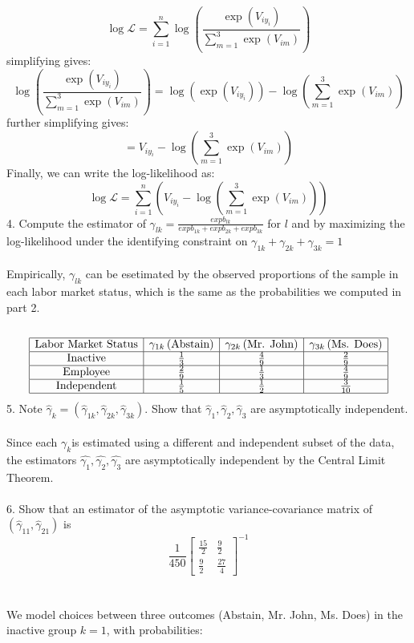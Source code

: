 \documentclass[12pt]{article}
\begin{document}
\begin{flushleft}
\[
\log \mathcal{L} = \sum_{i=1}^n \log\left( \frac{\exp(V_{iy_i})}{\sum_{m=1}^3 \exp(V_{im})} \right)
\]
simplifying gives:
\[
\log\left( \frac{\exp(V_{iy_i})}{\sum_{m=1}^3 \exp(V_{im})} \right) = \log(\exp(V_{iy_i})) - \log\left( \sum_{m=1}^3 \exp(V_{im}) \right)
\]
further simplifying gives:
\[
= V_{iy_i} - \log\left( \sum_{m=1}^3 \exp(V_{im}) \right)
\]
Finally, we can write the log-likelihood as:
\[
\log \mathcal{L} = \sum_{i=1}^{n} \left( V_{iy_i} - \log\left( \sum_{m=1}^3 \exp(V_{im}) \right) \right)
\]
4. Compute the estimator of $\gamma_{lk}=\frac{exp b_{lk}}{exp b_{1k}+exp b_{2k}+exp b_{3k}}$ for $l$ and by maximizing the log-likelihood under the identifying constraint on $\gamma_{1k}+\gamma_{2k}+\gamma_{3k}=1$\\~\\
Empirically, $\gamma_{lk}$ can be esetimated by the observed proportions of the sample in each labor market status, which is the same as the probabilities we computed in part 2.\\~\\
\[
\begin{array}{|c|c|c|c|}
\hline
\text{Labor Market Status} & \gamma_{1k} \, (\text{Abstain}) & \gamma_{2k} \, (\text{Mr. John}) & \gamma_{3k} \, (\text{Ms. Does}) \\
\hline
\text{Inactive} & \frac{1}{3} & \frac{4}{9} & \frac{2}{9} \\
\hline
\text{Employee} & \frac{2}{9} & \frac{1}{3} & \frac{4}{9} \\
\hline
\text{Independent} & \frac{1}{5} & \frac{1}{2} & \frac{3}{10} \\
\hline
\end{array}
\]
5. Note $\hat{\gamma}_k = (\hat{\gamma}_{1k}, \hat{\gamma}_{2k}, \hat{\gamma}_{3k})$. Show that $\hat{\gamma}_1, \hat{\gamma}_2, \hat{\gamma}_3$ are asymptotically independent.\\~\\

Since each $\gamma_k$is estimated using a different and independent subset of the data, the estimators $\hat{\gamma_1},\hat{\gamma_2},\hat{\gamma_3}$ are asymptotically independent by the Central Limit Theorem.\\~\\
6. Show that an estimator of the asymptotic variance-covariance matrix of $(\hat{\gamma}_{11}, \hat{\gamma}_{21})$ is
\[
\frac{1}{450} \begin{bmatrix}
    \frac{15}{2} & \frac{9}{2} \\
    \frac{9}{2} & \frac{27}{4}
\end{bmatrix}^{-1}
\]
\\~\\
We model choices between three outcomes (Abstain, Mr. John, Ms. Does) in the inactive group $k=1$, with probabilities:


\end{flushleft}
\end{document}
